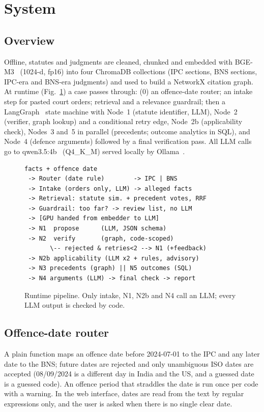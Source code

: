 \documentclass[conference]{IEEEtran}
\begin{document}
\section{System}\label{sec:system}

\subsection{Overview}
Offline, statutes and judgments are cleaned, chunked and embedded with BGE-M3~\cite{bgem3} (1024-d, fp16) into four ChromaDB collections (IPC sections, BNS sections, IPC-era and BNS-era judgments) and used to build a NetworkX citation graph. At runtime (Fig.~\ref{fig:pipeline}) a case passes through: (0) an offence-date router; an intake step for pasted court orders; retrieval and a relevance guardrail; then a LangGraph~\cite{langgraph} state machine with Node~1 (statute identifier, LLM), Node~2 (verifier, graph lookup) and a conditional retry edge, Node~2b (applicability check), Nodes~3 and~5 in parallel (precedents; outcome analytics in SQL), and Node~4 (defence arguments) followed by a final verification pass. All LLM calls go to qwen3.5:4b~\cite{qwen} (Q4\_K\_M) served locally by Ollama~\cite{ollama}.

\begin{figure}[t]
\centering
\small
\begin{verbatim}
facts + offence date
 -> Router (date rule)        -> IPC | BNS
 -> Intake (orders only, LLM) -> alleged facts
 -> Retrieval: statute sim. + precedent votes, RRF
 -> Guardrail: too far? -> review list, no LLM
 -> [GPU handed from embedder to LLM]
 -> N1  propose      (LLM, JSON schema)
 -> N2  verify       (graph, code-scoped)
       \-- rejected & retries<2 --> N1 (+feedback)
 -> N2b applicability (LLM x2 + rules, advisory)
 -> N3 precedents (graph) || N5 outcomes (SQL)
 -> N4 arguments (LLM) -> final check -> report
\end{verbatim}
\caption{Runtime pipeline. Only intake, N1, N2b and N4 call an LLM; every LLM output is checked by code.}
\label{fig:pipeline}
\end{figure}

\subsection{Offence-date router}
A plain function maps an offence date before 2024-07-01 to the IPC and any later date to the BNS; future dates are rejected and only unambiguous ISO dates are accepted (08/09/2024 is a different day in India and the US, and a guessed date is a guessed code). An offence period that straddles the date is run once per code with a warning. In the web interface, dates are read from the text by regular expressions only, and the user is asked when there is no single clear date.
\end{document}
